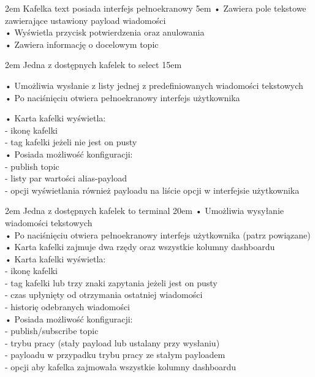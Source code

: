 {2em}{
    Kafelka text posiada interfejs pełnoekranowy}
{5em}{
    • Zawiera pole tekstowe zawierające ustawiony payload wiadomości\\
    • Wyświetla przycisk potwierdzenia oraz anulowania\\
    • Zawiera informację o docelowym topic
}

{2em}{
    Jedna z dostępnych kafelek to select
}
{15em}{
    • Umożliwia wysłanie z listy jednej z predefiniowanych wiadomości tekstowych\\
    • Po naciśnięciu otwiera pełnoekranowy interfejs użytkownika

    • Karta kafelki wyświetla:\\
    - ikonę kafelki\\
    - tag kafelki jeżeli nie jest on pusty\\

    • Posiada możliwość konfiguracji:\\
    - publish topic\\
    - listy par wartości alias-payload\\
    - opcji wyświetlania również payloadu na liście opcji w interfejsie użytkownika
}

{2em}{
    Jedna z dostępnych kafelek to terminal
}
{20em}{
    • Umożliwia wysyłanie wiadomości tekstowych\\
    • Po naciśnięciu otwiera pełnoekranowy interfejs użytkownika (patrz powiązane)\\
    • Karta kafelki zajmuje dwa rzędy oraz wszystkie kolumny dashboardu\\

    • Karta kafelki wyświetla:\\
    - ikonę kafelki\\
    - tag kafelki lub trzy znaki zapytania jeżeli jest on pusty\\
    - czas upłynięty od otrzymania ostatniej wiadomości\\
    - historię odebranych wiadomości\\

    • Posiada możliwość konfiguracji:\\
    - publish/subscribe topic\\
    - trybu pracy (stały payload lub ustalany przy wysłaniu)\\
    - payloadu w przypadku trybu pracy ze stałym payloadem\\
    - opcji aby kafelka zajmowała wszystkie kolumny dashboardu
}

